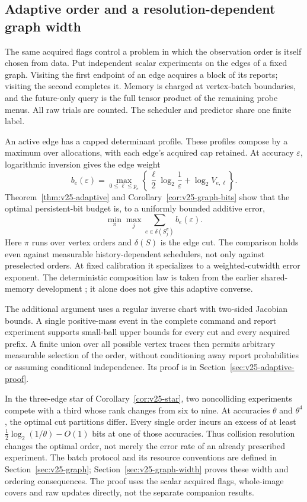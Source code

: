 \subsection{Adaptive order and a resolution-dependent graph width}
The same acquired flags control a problem in which the observation order
is itself chosen from data. Put independent scalar experiments on the
edges of a fixed graph. Visiting the first endpoint of an edge acquires
a block of its reports; visiting the second completes it. Memory is
charged at vertex-batch boundaries, and the future-only query is the
full tensor product of the remaining probe menus. All raw trials are
counted. The scheduler and predictor share one finite label.

An active edge has a capped determinant profile. These profiles compose
by a maximum over allocations, with each edge's acquired cap retained.
At accuracy $\varepsilon$, logarithmic inversion gives the edge weight
\[
 b_e(\varepsilon)=\max_{0\le\ell\le p_e}
       \left\{\frac{\ell}{2}\log_2\frac1\varepsilon
                                  +\log_2V_{e,\ell}\right\}.
\]
Theorem~\ref{thm:v25-adaptive} and Corollary~\ref{cor:v25-graph-bits}
show that the optimal persistent-bit budget is, to a uniformly bounded
additive error,
\[
 \min_{\pi}\max_j\sum_{e\in\delta(S_j^\pi)}b_e(\varepsilon).
\]
Here $\pi$ runs over vertex orders and $\delta(S)$ is the edge cut.
The comparison holds even against measurable history-dependent
schedulers, not only against preselected orders. At fixed calibration
it specializes to a weighted-cutwidth error exponent. The deterministic
composition law is taken from the earlier shared-memory development
\cite{QiSharedMemory2026}; it alone does not give this adaptive converse.

The additional argument uses a regular inverse chart with two-sided
Jacobian bounds. A single positive-mass event in the complete command
and report experiment supports small-ball upper bounds for every cut
and every acquired prefix. A finite union over all possible vertex
traces then permits arbitrary measurable selection of the order, without
conditioning away report probabilities or assuming conditional
independence. Its proof is in Section~\ref{sec:v25-adaptive-proof}.

In the three-edge star of Corollary~\ref{cor:v25-star}, two noncolliding
experiments compete with a third whose rank changes from six to nine.
At accuracies $\theta$ and $\theta^4$, the optimal cut partitions differ.
Every single order incurs an excess of at least
$\tfrac12\log_2(1/\theta)-O(1)$ bits at one of those accuracies.
Thus collision resolution changes the optimal order, not merely the
error rate of an already prescribed experiment. The batch protocol and
its resource conventions are defined in Section~\ref{sec:v25-graph};
Section~\ref{sec:v25-graph-width} proves these width and ordering
consequences. The proof uses the scalar acquired flags, whole-image
covers and raw updates directly, not the separate companion results.
